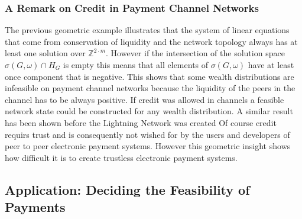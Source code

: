 \documentclass[10pt,twocolumn]{article}
\begin{document}
\subsubsection{A Remark on Credit in Payment Channel Networks}
\label{sec:credit}
The previous geometric example illustrates that the system of linear equations that come from conservation of liquidity and the network topology always has at least one solution over $\mathbb{Z}^{2\cdot m}$.
However if the intersection of the solution space \(\sigma(G,\omega) \cap H_G\) is empty this means that all elements of $\sigma(G,\omega)$ have at least once component that is negative. 
This shows that some wealth distributions are infeasible on payment channel networks because the liquidity of the peers in the channel has to be always positive.
If credit was allowed in channels a feasible network state could be constructed for any wealth distribution.
A similar result has been shown before the Lightning Network was created \cite{dandekar2011liquidity}
Of course credit requirs trust and is consequently not wished for by the users and developers of peer to peer electronic payment systems.
However this geometric insight shows how difficult it is to create trustless electronic payment systems.


\subsection{Application: Deciding the Feasibility of Payments}


\end{document}
